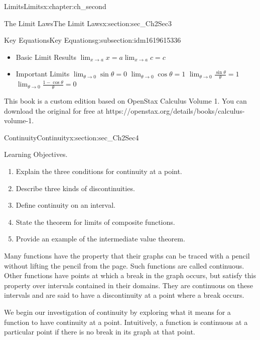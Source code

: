 \documentclass[oneside,10pt,]{book}
\numberwithin{equation}{section}
\begin{document}
\begin{chapterptx}{Limits}{}{Limits}{}{}{x:chapter:ch_second}
\begin{sectionptx}{The Limit Laws}{}{The Limit Laws}{}{}{x:section:sec_Ch2Sec3}
%
\begin{subsectionptx}{Key Equations}{}{Key Equations}{}{}{g:subsection:idm1619615336}
%
\begin{itemize}[label=\textbullet]
\item{}Basic Limit Results \(\lim_{x \to a }x=a \lim_{x \to a }c=c\)%
\item{}Important Limits \(\lim_{\theta\to0}\sin \theta=0\) \(\lim_{\theta\to0}\cos \theta=1\) \(\lim_{\theta\to0}\frac{\sin \theta}{\theta}=1\) \(\lim_{\theta\to0}\frac{1-\cos \theta}{\theta}=0\)%
\end{itemize}
\end{subsectionptx}
This book is a custom edition based on OpenStax Calculus Volume 1. You can download the original for free at https:\slash{}\slash{}openstax.org\slash{}details\slash{}books\slash{}calculus-volume-1.%
\end{sectionptx}
%
%
\typeout{************************************************}
\typeout{************************************************}
%
\begin{sectionptx}{Continuity}{}{Continuity}{}{}{x:section:sec_Ch2Sec4}
\begin{introduction}{Learning Objectives.}%
%
\begin{enumerate}
\item{}Explain the three conditions for continuity at a point.%
\item{}Describe three kinds of discontinuities.%
\item{}Define continuity on an interval.%
\item{}State the theorem for limits of composite functions.%
\item{}Provide an example of the intermediate value theorem.%
\end{enumerate}
Many functions have the property that their graphs can be traced with a pencil without lifting the pencil from the page. Such functions are called continuous. Other functions have points at which a break in the graph occurs, but satisfy this property over intervals contained in their domains. They are continuous on these intervals and are said to have a discontinuity at a point where a break occurs.%
\par
We begin our investigation of continuity by exploring what it means for a function to have continuity at a point. Intuitively, a function is continuous at a particular point if there is no break in its graph at that point.%
\end{introduction}%

\end{sectionptx}
\end{chapterptx}
\end{document}
